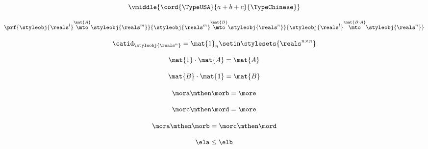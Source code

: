 {\begin{forslides}
        \begin{equation}
            \label{eq:semicats-slides-130}
            \vmiddle{\cord{\TypeUSA}{a + b + c}{\TypeChinese}}
        \end{equation}

        \begin{equation}
            \label{eq:semicats-slides-131}
            \prf{
                \styleobj{\reals^l} \overset{\mat{A}}{\mto} \styleobj{\reals^m}
            }{
                \styleobj{\reals^m} \overset{\mat{B}}{\mto} \styleobj{\reals^n}
            }{
                \styleobj{\reals^l} \overset{\mat{B \cdot A}}{\mto} \styleobj{\reals^n}
            }
        \end{equation}

        \begin{equation}
            \label{eq:semicats-slides-132}
            \catid_{\styleobj{\reals^n}} = \mat{1}_n \setin \stylesets{\reals^{n \times n}}
        \end{equation}

        \begin{equation}
            \label{eq:semicats-slides-133}
            \mat{1} \cdot \mat{A} = \mat{A}
        \end{equation}

        \begin{equation}
            \label{eq:semicats-slides-134}
            \mat{B} \cdot \mat{1} = \mat{B}
        \end{equation}

        \begin{equation}
            \label{eq:semicats-slides-135}
            \mora \mthen \morb = \more
        \end{equation}

        \begin{equation}
            \label{eq:semicats-slides-136}
            \morc \mthen \mord = \more
        \end{equation}

        \begin{equation}
            \label{eq:semicats-slides-137}
            \mora \mthen \morb = \morc \mthen \mord
        \end{equation}

        \begin{equation}
            \label{eq:semicats-slides-138}
            \ela \leq \elb
        \end{equation}


\end{forslides}}
